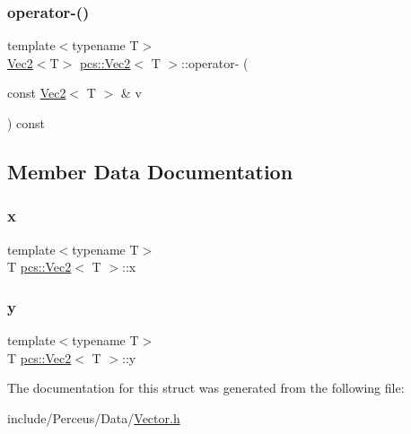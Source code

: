 \subsubsection{\texorpdfstring{operator-\/()}{operator-()}}
{\footnotesize\ttfamily template$<$typename T$>$ \\
\hyperlink{structpcs_1_1Vec2}{Vec2}$<$T$>$ \hyperlink{structpcs_1_1Vec2}{pcs\+::\+Vec2}$<$ T $>$\+::operator-\/ (\begin{DoxyParamCaption}\item[{const \hyperlink{structpcs_1_1Vec2}{Vec2}$<$ T $>$ \&}]{v }\end{DoxyParamCaption}) const\hspace{0.3cm}{\ttfamily [inline]}}



\subsection{Member Data Documentation}
\mbox{\label{structpcs_1_1Vec2_a1fe4fba4477b300614ae69042d5ecc53}} 
\subsubsection{\texorpdfstring{x}{x}}
{\footnotesize\ttfamily template$<$typename T$>$ \\
T \hyperlink{structpcs_1_1Vec2}{pcs\+::\+Vec2}$<$ T $>$\+::x}

\mbox{\label{structpcs_1_1Vec2_a6aaf08a33b2d7c35070cc8ab32e8926e}} 
\subsubsection{\texorpdfstring{y}{y}}
{\footnotesize\ttfamily template$<$typename T$>$ \\
T \hyperlink{structpcs_1_1Vec2}{pcs\+::\+Vec2}$<$ T $>$\+::y}



The documentation for this struct was generated from the following file\+:\begin{DoxyCompactItemize}
\item 
include/\+Perceus/\+Data/\hyperlink{Vector_8h}{Vector.\+h}\end{DoxyCompactItemize}
